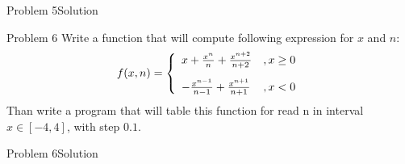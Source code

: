 \begin{frame}[fragile]{Problem 5}{Solution}
   
\end{frame}

\begin{frame}{Problem 6}
Write a function that will compute following expression for $x$ and $n$:
\[
   f(x, n) = \left\{ 
  \begin{array}{l l}
    x + \frac{x^n}{n} + \frac{x^{n+2}}{n + 2} &,x\geq0\\[10px]
    - \frac{x^{n - 1}}{n - 1} + \frac{x^{n+1}}{n + 1} &,x<0
  \end{array} \right.
\]
Than write a program that will table this function for read n in interval
$x\in[-4, 4]$, with step $0.1$.
\end{frame}

\begin{frame}[fragile]{Problem 6}{Solution}
\begin{columns}
          
        
\end{columns}
\end{frame}


